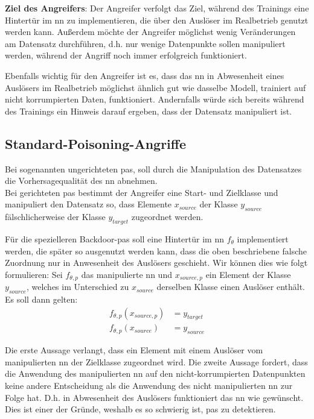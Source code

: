 \documentclass[twoside, 12pt,a4paper]{book}
\numberwithin{equation}{section}
\begin{document}
	\noindent\textbf{Ziel des Angreifers}: Der Angreifer verfolgt das Ziel, während des Trainings
	eine Hintertür im \ac{nn} zu implementieren, die über den Auslöser im Realbetrieb
	genutzt werden kann. Außerdem möchte der Angreifer möglichst wenig Veränderungen am Datensatz durchführen, d.h. nur wenige Datenpunkte sollen manipuliert werden, während der Angriff noch immer erfolgreich funktioniert.
	
	\noindent Ebenfalls wichtig für den Angreifer ist es, dass das \ac{nn} in Abwesenheit eines Auslösers im Realbetrieb möglichst ähnlich gut wie dasselbe Modell, trainiert auf nicht korrumpierten Daten, funktioniert. Andernfalls würde sich bereits während des
	Trainings ein Hinweis darauf ergeben, dass der Datensatz manipuliert ist.
	
	
	
	 
	
	
	\subsection{Standard-Poisoning-Angriffe}
	Bei sogenannten ungerichteten \acfp{pa}, soll durch die Manipulation des Datensatzes die Vorhersagequalität des \ac{nn} abnehmen.\\
	
	\noindent Bei gerichteten \acp{pa} bestimmt der Angreifer eine Start- und Zielklasse und manipuliert den Datensatz so, dass Elemente $x_{source}$ der Klasse $y_{source}$  fälschlicherweise der Klasse $y_{target}$ zugeordnet werden.
	
	\noindent Für die spezielleren Backdoor-\acp{pa} soll eine Hintertür im \ac{nn} $f_\theta$ implementiert werden, die später so ausgenutzt werden kann, dass die oben beschriebene falsche Zuordnung nur in Anwesenheit des Auslösers geschieht. Wir können dies wie folgt formulieren: Sei $f_{\theta,p}$ das manipulierte \ac{nn} und $x_{source,p}$ ein Element der Klasse $y_{source}$, welches im Unterschied zu $x_{source}$ derselben Klasse einen Auslöser enthält. Es soll dann gelten:
	\begin{align*}
		f_{\theta,p}(x_{source,p}) &= y_{target} \\
		f_{\theta,p}(x_{source}) &= y_{source}
	\end{align*}
	
	\noindent Die erste Aussage verlangt, dass ein Element mit einem Auslöser vom manipulierten \ac{nn} der Zielklasse zugeordnet wird.
	Die zweite Aussage fordert, dass die Anwendung des manipulierten \ac{nn} auf den nicht-korrumpierten Datenpunkten keine andere Entscheidung als die Anwendung des nicht manipulierten \ac{nn} zur Folge hat. D.h. in Abwesenheit des Auslösers funktioniert das \ac{nn} wie gewünscht. Dies ist einer der Gründe, weshalb es so schwierig ist, \acp{pa} zu detektieren.
	
\end{document}
